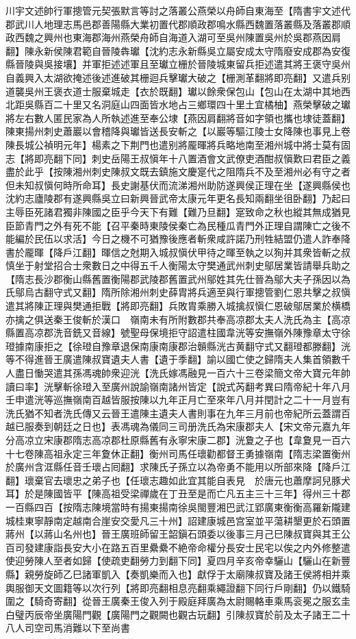 川宇文述帥行軍摠管元契張默言等討之落叢公燕榮以舟師自東海至【隋書宇文述代郡武川人地理志馬邑郡善陽縣大業初置代郡順政郡鳴水縣西魏置落叢縣及落叢郡順政西魏之興州也東海郡海州燕榮舟師自海道入湖可至吳州陳置吳州於吳郡燕因肩翻】陳永新侯陳君範自晉陵犇瓛【沈約志永新縣吳立屬安成太守隋廢安成郡為安復縣晉陵與吳接壤】并軍拒述述軍且至瓛立栅於晉陵城東留兵拒述遣其將王褒守吳州自義興入太湖欲掩述後述進破其栅迴兵擊瓛大破之【栅測革翻將即亮翻】又遣兵别道襲吳州王褒衣道士服棄城走【衣於既翻】瓛以餘衆保包山【包山在太湖中其地西北距吳縣百二十里又名洞庭山四面皆水地占三鄉環四十里土宜橘柚】燕榮擊破之瓛將左右數人匿民家為人所執述進至奉公埭【燕因肩翻將音如字領也攜也埭徒蓋翻】陳東揚州刺史蕭巖以會稽降與瓛皆送長安斬之【以巖等驅江陵士女降陳也事見上卷陳長城公禎明元年】楊素之下荆門也遣别將龎暉將兵略地南至湘州城中將士莫有固志【將即亮翻下同】刺史岳陽王叔愼年十八置酒會文武僚吏酒酣叔愼歎曰君臣之義盡於此乎【按陳湘州刺史陳叔文既去鎮施文慶寔代之阻隋兵不及至湘州必有守之者但未知叔愼何時所命耳】長史謝基伏而流涕湘州助防遂興侯正理在坐【遂興縣侯也沈約志廬陵郡有遂興縣吳立曰新興晉武帝太康元年更名長知兩翻坐徂卧翻】乃起曰主辱臣死諸君獨非陳國之臣乎今天下有難【難乃旦翻】寔致命之秋也縱其無成猶見臣節青門之外有死不能【召平秦時東陵侯秦亡為民種瓜青門外正理自謂陳亡之後不能編於民伍以求活】今日之機不可猶豫後應者斬衆咸許諾乃刑牲結盟仍遣人詐奉降書於龎暉【降戶江翻】暉信之尅期入城叔愼伏甲待之暉至執之以狥并其衆皆斬之叔慎坐于射堂招合士衆數日之中得五千人衡陽太守樊通武州刺史鄔居業皆請舉兵助之【隋志長沙郡衡山縣舊置衡陽郡武陵郡舊置武州鄔姓其先仕晉為鄔大夫子孫因以為氏鄔烏古翻守式又翻】隋所除湘州刺史薛胄將兵適至與行軍摠管劉仁恩共擊之叔愼遣其將陳正理與樊通拒戰【將即亮翻】兵敗胄乘勝入城擒叔愼仁恩破鄔居業於横橋亦擒之俱送秦王俊斬於漢口　嶺南未有所附數郡共奉高凉郡太夫人洗氏為主【高凉縣置高凉郡洗音銑又音線】號聖母保境拒守詔遣柱國韋洸等安撫嶺外陳豫章太守徐璒據南康拒之【徐璒自豫章退保南康南康郡治贑縣洸古黄翻守式又翻璒都滕翻】洸等不得進晉王廣遣陳叔寶遺夫人書【遺于季翻】諭以國亡使之歸隋夫人集首領數千人盡日慟哭遣其孫馮魂帥衆迎洸【洗氏嫁馮融見一百六十三卷梁簡文帝大寶元年帥讀曰率】洸擊斬徐璒入至廣州說諭嶺南諸州皆定【說式芮翻考異曰隋帝紀十年八月壬申遣洸等巡撫嶺南百越皆服按陳以九年正月亡至來年八月并閏計之二十一月豈有洗氏猶不知者洗氏傳又云晉王遣陳主遺夫人書則事在九年三月前也帝紀所云蓋謂百越已服奏到朝廷之日也】表馮魂為儀同三司册洗氏為宋康郡夫人【宋文帝元嘉九年分高凉立宋康郡隋志高凉郡杜原縣舊有永寧宋康二郡】洸夐之子也【韋夐見一百六十七卷陳高祖永定三年夐休正翻】衡州司馬任瓌勸都督王勇據嶺南【隋志梁置衡州於廣州含洭縣任音壬瓌占囘翻】求陳氏子孫立以為帝勇不能用以所部來降【降戶江翻】瓌棄官去瓌忠之弟子也【任瓌志趣如此宜其能自表見　於唐元也蕭摩訶兒豚犬耳】於是陳國皆平【陳高祖受梁禪歲在丁丑至是而亡凡五主三十三年】得州三十郡一百縣四百【按隋志陳境當時有揚東揚南徐吳閩豐湘巴武江郢廣東衡衡高羅新隴建城桂東寧靜南定越南合崖安交愛凡三十州】詔建康城邑宫室並平蕩耕墾更於石頭置蔣州【以蔣山名州也】晉王廣班師留王韶鎭石頭委以後事三月己巳陳叔寶與其王公百司發建康詣長安大小在路五百里纍纍不絶帝命權分長安士民宅以俟之内外修整遣使迎勞陳人至者如歸【使疏吏翻勞力到翻下同】夏四月辛亥帝幸驪山【驪山在新豐縣】親勞旋師乙巳諸軍凱入【奏凱樂而入也】獻俘于太廟陳叔寶及諸王侯將相并乘輿服御天文圖籍等以次行列【將即亮翻相息亮翻乘繩證翻下同行戶剛翻】仍以鐵騎圍之【騎奇寄翻】從晉王廣秦王俊入列于殿庭拜廣為太尉賜輅車乘馬衮冕之服玄圭白璧丙辰帝坐廣陽門觀【廣陽門之觀闕也觀古玩翻】引陳叔寶於前及太子諸王二十八人司空司馬消難以下至尚書